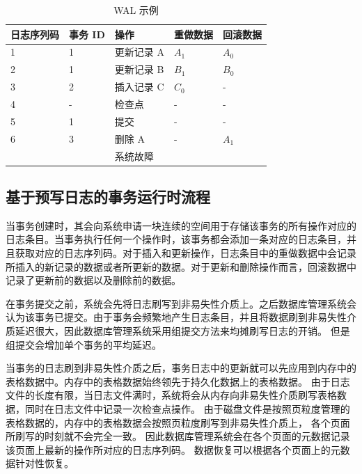 \begin{table}
    \centering
    \caption{WAL 示例}
    \begin{tabular}{lllll}
        \toprule
        日志序列码 & 事务 ID & 操作       & 重做数据 & 回滚数据 \\
        \midrule
        1          & 1       & 更新记录 A & $A_1$    & $A_0$    \\
        2          & 1       & 更新记录 B & $B_1$    & $B_0$    \\
        3          & 2       & 插入记录 C & $C_0$    & -        \\
        4          & -       & 检查点     & -        & -        \\
        5          & 1       & 提交       & -        & -        \\
        6          & 3       & 删除 A     & -        & $A_1$    \\
                   &         & 系统故障   &          &          \\
        \bottomrule
    \end{tabular}
    \label{tab:wal}
\end{table}

\subsection{基于预写日志的事务运行时流程}

当事务创建时，其会向系统申请一块连续的空间用于存储该事务的所有操作对应的日志条目。当事务执行任何一个操作时，该事务都会添加一条对应的日志条目，并且获取对应的日志序列码。对于插入和更新操作，日志条目中的重做数据中会记录所插入的新记录的数据或者所更新的数据。对于更新和删除操作而言，回滚数据中记录了更新前的数据以及删除前的数据。

在事务提交之前，系统会先将日志刷写到非易失性介质上。之后数据库管理系统会认为该事务已提交。由于事务会频繁地产生日志条目，并且将数据刷到非易失性介质延迟很大，因此数据库管理系统采用组提交方法来均摊刷写日志的开销。
但是组提交会增加单个事务的平均延迟。

当事务的日志刷到非易失性介质之后，事务日志中的更新就可以先应用到内存中的表格数据中。内存中的表格数据始终领先于持久化数据上的表格数据。
由于日志文件的长度有限，当日志文件满时，系统将会从内存向非易失性介质刷写表格数据，同时在日志文件中记录一次检查点操作。
由于磁盘文件是按照页粒度管理的表格数据的，内存中的表格数据会按照页粒度刷写到非易失性介质上，
各个页面所刷写的时刻就不会完全一致。
因此数据库管理系统会在各个页面的元数据记录该页面上最新的操作所对应的日志序列码。
数据恢复可以根据各个页面上的元数据针对性恢复。


